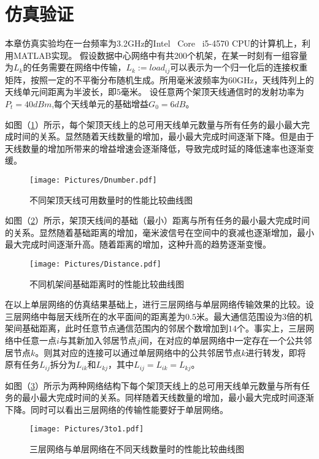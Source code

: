 \section{仿真验证}

本章仿真实验均在一台频率为3.2GHz的Intel\textregistered ~ Core\texttrademark ~ i5-4570 CPU的计算机上，利用MATLAB\textregistered 实现。
假设数据中心网络中有共200个机架，在某一时刻有一组容量为$L_{k}$的任务需要在网络中传输，$L_{k}:=load_{ij}$可以表示为一个归一化后的连接权重矩阵，按照一定的不平衡分布随机生成。所用毫米波频率为$60$GHz，天线阵列上的天线单元间距离为半波长，即$5$毫米。
设任意两个架顶天线通信时的发射功率为$P_t = 40dBm$,每个天线单元的基础增益$G_0 = 6dB$。

如图（\ref{fig:dn}）所示，每个架顶天线上的总可用天线单元数量与所有任务的最小最大完成时间的关系。显然随着天线数量的增加，最小最大完成时间逐渐下降。但是由于天线数量的增加所带来的增益增速会逐渐降低，导致完成时延的降低速率也逐渐变缓。

\begin{figure}[htbp]
	\centering
	\texttt{[image: Pictures/Dnumber.pdf]}
	\caption{不同架顶天线可用数量时的性能比较曲线图}
	\label{fig:dn}
\end{figure}

如图（\ref{fig:dd}）所示，架顶天线间的基础（最小）距离与所有任务的最小最大完成时间的关系。显然随着基础距离的增加，毫米波信号在空间中的衰减也逐渐增加，最小最大完成时间逐渐升高。随着距离的增加，这种升高的趋势逐渐变慢。

\begin{figure}[htbp]
	\centering
	\texttt{[image: Pictures/Distance.pdf]}
	\caption{不同机架间基础距离时的性能比较曲线图}
	\label{fig:dd}
\end{figure}

在以上单层网络的仿真结果基础上，进行三层网络与单层网络传输效果的比较。设三层网络中每层天线所在的水平面间的距离差为$0.5$米。最大通信范围设为$3$倍的机架间基础距离，此时任意节点通信范围内的邻居个数增加到$14$个。事实上，三层网络中任意一点$i$与其新加入邻居节点$j$间，在对应的单层网络中一定存在一个公共邻居节点$k$。则其对应的连接可以通过单层网络中的公共邻居节点$k$进行转发，即将原有任务$L_{ij}$拆分为$L_{ik}$和$L_{kj}$，其中$L_{ij}=L_{ik}=L_{kj}$。

如图（\ref{fig:3to1}）所示为两种网络结构下每个架顶天线上的总可用天线单元数量与所有任务的最小最大完成时间的关系。同样随着天线数量的增加，最小最大完成时间逐渐下降。同时可以看出三层网络的传输性能要好于单层网络。

\begin{figure}[htbp]
	\centering
	\texttt{[image: Pictures/3to1.pdf]}
	\caption{三层网络与单层网络在不同天线数量时的性能比较曲线图}
	\label{fig:3to1}
\end{figure}

